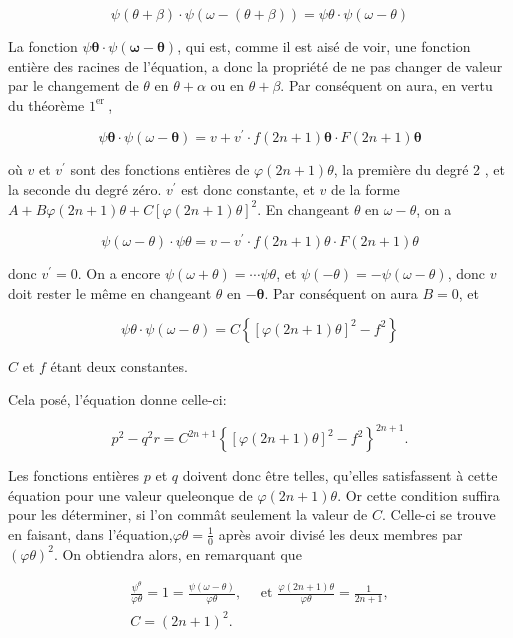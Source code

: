 \documentclass{article}
\begin{document}
\[
\psi(\theta+\beta) \cdot \psi(\omega-(\theta+\beta))=\psi \theta \cdot \psi(\omega-\theta)
\]

La fonction \(\psi \boldsymbol{\theta} \cdot \psi(\boldsymbol{\omega}-\boldsymbol{\theta})\), qui est, comme il est aisé de voir, une fonction entière des racines de l'équation, a donc la propriété de ne pas changer de valeur par le changement de \(\theta\) en \(\theta+\alpha\) ou en \(\theta+\beta\). Par conséquent on aura, en vertu du théorème \(1^{\text {er }}\),

\[
\psi \boldsymbol{\theta} \cdot \psi(\omega-\boldsymbol{\theta})=v+v^{\prime} \cdot f(2 n+1) \boldsymbol{\theta} \cdot F(2 n+1) \boldsymbol{\theta}
\]

où \(v\) et \(v^{\prime}\) sont des fonctions entières de \(\varphi(2 n+1) \theta\), la première du degré 2 , et la seconde du degré zéro. \(v^{\prime}\) est donc constante, et \(v\) de la forme \(A+B \varphi(2 n+1) \theta+C[\varphi(2 n+1) \theta]^{2}\). En changeant \(\theta\) en \(\omega-\theta\), on a

\[
\psi(\omega-\theta) \cdot \psi \theta=v-v^{\prime} \cdot f(2 n+1) \theta \cdot F(2 n+1) \theta
\]

donc \(v^{\prime}=0\). On a encore \(\psi(\omega+\theta)=\cdots \psi \theta\), et \(\psi(-\theta)=-\psi(\omega-\theta)\), donc \(v\) doit rester le même en changeant \(\theta\) en \(-\boldsymbol{\theta}\). Par conséquent on aura \(B=0\), et

\[
\psi \theta \cdot \psi(\omega-\theta)=C\left\{[\varphi(2 n+1) \theta]^{2}-f^{2}\right\}
\]

\(C\) et \(f\) étant deux constantes.

Cela posé, l'équation donne celle-ci:

\[
p^{2}-q^{2} r=C^{2 n+1}\left\{[\varphi(2 n+1) \theta]^{2}-f^{2}\right\}^{2 n+1} .
\]

Les fonctions entières \(p\) et \(q\) doivent donc être telles, qu'elles satisfassent à cette équation pour une valeur queleonque de \(\varphi(2 n+1) \theta\). Or cette condition suffira pour les déterminer, si l'on commât seulement la valeur de \(C\). Celle-ci se trouve en faisant, dans l'équation,\(\varphi \theta=\frac{1}{0}\) après avoir divisé les deux membres par \((\varphi \theta)^{2}\). On obtiendra alors, en remarquant que

\[
\begin{gathered}
\frac{\psi^{\theta}}{\varphi \theta}=1=\frac{\psi(\omega-\theta)}{\varphi \theta}, \quad \text { et } \frac{\varphi(2 n+1) \theta}{\varphi \theta}=\frac{1}{2 n+1}, \\
C=(2 n+1)^{2} .
\end{gathered}
\]
\end{document}
